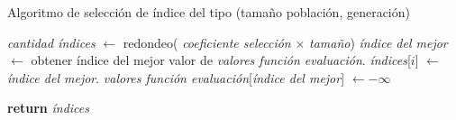 \begin{algorithm}[H]
    \caption{Algoritmo de selección de índice del tipo (tamaño población, generación)}
    \begin{algorithmic}[1]
        \State \textit{cantidad índices} $\gets$ redondeo( \textit{coeficiente selección} $\times$   \textit {tamaño})
            \State \textit{índice del mejor} $\gets$ obtener índice del mejor valor de \textit{valores función evaluación}. 
            \State \textit{índices}[$i$] $\gets$  \textit{índice del mejor}. 
            \State \textit{valores función evaluación}[\textit{índice del mejor}] $\gets - \infty$

        \EndFor
        \State\textbf{return}  \textit{índices}
    \end{algorithmic}
\end{algorithm}